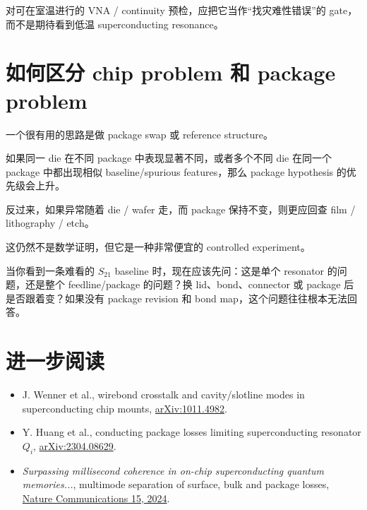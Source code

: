 对可在室温进行的 VNA / continuity 预检，应把它当作“找灾难性错误”的 gate，而不是期待看到低温 superconducting resonance。

\section{如何区分 chip problem 和 package problem}

一个很有用的思路是做 package swap 或 reference structure。

如果同一 die 在不同 package 中表现显著不同，或者多个不同 die 在同一个 package 中都出现相似 baseline/spurious features，那么 package hypothesis 的优先级会上升。

反过来，如果异常随着 die / wafer 走，而 package 保持不变，则更应回查 film / lithography / etch。

这仍然不是数学证明，但它是一种非常便宜的 controlled experiment。

\begin{checkpointbox}
当你看到一条难看的 $S_{21}$ baseline 时，现在应该先问：这是单个 resonator 的问题，还是整个 feedline/package 的问题？换 lid、bond、connector 或 package 后是否跟着变？如果没有 package revision 和 bond map，这个问题往往根本无法回答。
\end{checkpointbox}

\section*{进一步阅读}

\begin{itemize}
  \item J. Wenner et al., wirebond crosstalk and cavity/slotline modes in superconducting chip mounts, \href{https://arxiv.org/abs/1011.4982}{arXiv:1011.4982}.
  \item Y. Huang et al., conducting package losses limiting superconducting resonator $Q_i$, \href{https://arxiv.org/abs/2304.08629}{arXiv:2304.08629}.
  \item \textit{Surpassing millisecond coherence in on-chip superconducting quantum memories...}, multimode separation of surface, bulk and package losses, \href{https://www.nature.com/articles/s41467-024-47857-6}{Nature Communications 15, 2024}.
\end{itemize}
